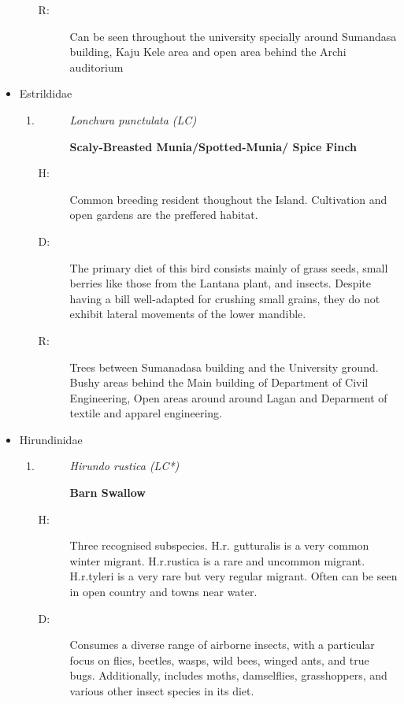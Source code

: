 \begin{itemize}
\begin{enumerate}
\begin{description}
\item[R: ]%
Can be seen throughout the university specially around Sumandasa building, Kaju Kele area and open area behind the Archi auditorium%
\end{description}%
\end{enumerate}%
\item%
Estrildidae%
\begin{enumerate}%
\item%
\begin{description}%
\item[]%
\textit{Lonchura punctulata (LC)}%
\item[]%
\textbf{Scaly{-}Breasted Munia/Spotted{-}Munia/ Spice Finch}%
\end{description}%
\begin{description}%
\item[H: ]%
Common breeding resident thoughout the Island. Cultivation and open gardens are the preffered habitat.%
\item[D: ]%
The primary diet of this bird consists mainly of grass seeds, small berries like those from the Lantana plant, and insects. Despite having a bill well{-}adapted for crushing small grains, they do not exhibit lateral movements of the lower mandible.%
\item[R: ]%
Trees between Sumanadasa building and the University ground. Bushy areas behind the Main building of Department of Civil Engineering, Open areas around around Lagan and Deparment of textile and apparel engineering.%
\end{description}%
\end{enumerate}%
\item%
Hirundinidae%
\begin{enumerate}%
\item%
\begin{description}%
\item[]%
\textit{Hirundo rustica (LC*)}%
\item[]%
\textbf{Barn Swallow}%
\end{description}%
\begin{description}%
\item[H: ]%
Three recognised subspecies. H.r. gutturalis is a very common winter migrant. H.r.rustica is a rare and uncommon migrant. H.r.tyleri is a very rare but very regular migrant. Often can be seen in open country and towns near water.%
\item[D: ]%
Consumes a diverse range of airborne insects, with a particular focus on flies, beetles, wasps, wild bees, winged ants, and true bugs. Additionally, includes moths, damselflies, grasshoppers, and various other insect species in its diet.%

\end{description}
\end{enumerate}
\end{itemize}
